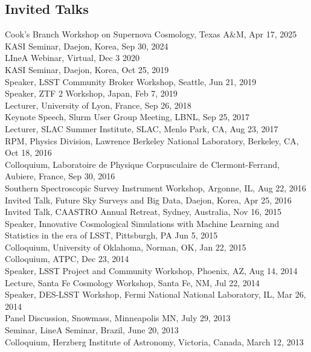\documentclass[line, margin]{res}
\begin{document}
\begin{resume}
\section{Invited Talks}
Cook's Branch Workshop on Supernova Cosmology, Texas A\&M, Apr 17, 2025
KASI Seminar, Daejon, Korea, Sep 30, 2024\\
LIneA Webinar, Virtual, Dec 3 2020\\
KASI Seminar, Daejon, Korea, Oct 25, 2019\\
Speaker, LSST Community Broker Workshop, Seattle, Jun 21, 2019\\
Speaker, ZTF 2 Workshop, Japan, Feb 7, 2019\\
Lecturer, University of Lyon, France, Sep 26, 2018 \\
Keynote Speech, Slurm User Group Meeting, LBNL, Sep 25, 2017\\
Lecturer, SLAC Summer Institute, SLAC, Menlo Park, CA, Aug 23, 2017\\
RPM, Physics Division, Lawrence Berkeley National Laboratory, Berkeley, CA, Oct 18, 2016\\
Colloquium, Laboratoire de Physique Corpusculaire de Clermont-Ferrand, Aubiere, France, Sep 30, 2016\\
Southern Spectroscopic Survey Instrument Workshop, Argonne, IL, Aug 22, 2016\\
Invited Talk, Future Sky Surveys and Big Data, Daejon, Korea, Apr 25, 2016\\
Invited Talk, CAASTRO Annual Retreat, Sydney, Australia, Nov 16, 2015\\
Speaker, Innovative Cosmological Simulations with Machine Learning and Statistics in the era of LSST, Pittsburgh, PA  Jun 5, 2015\\
Colloquium, University of Oklahoma, Norman, OK, Jan 22, 2015\\
Colloquium, ATPC, Dec 23, 2014\\
Speaker, LSST Project and Community Workshop, Phoenix, AZ, Aug 14, 2014\\
Lecture, Santa Fe Cosmology Workshop, Santa Fe, NM, Jul 22, 2014\\
Speaker, DES-LSST Workshop, Fermi National National Laboratory, IL, Mar 26, 2014\\
Panel Discussion, Snowmass, Minneapolis MN, July 29, 2013\\
Seminar, LineA Seminar, Brazil, June 20, 2013\\
Colloquium, Herzberg Institute of Astronomy, Victoria, Canada, March 12, 2013\\

\end{resume}
\end{document}
